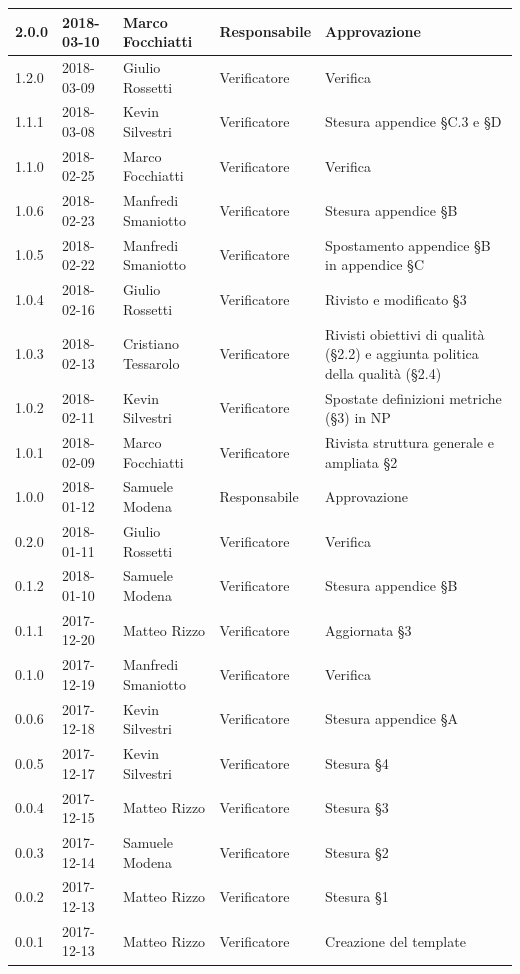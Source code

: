 \documentclass[openany,12pt,a4paper]{report}
\begin{document}
\begin{longtable}{|p{20mm}|p{20mm}|p{40mm}|p{30mm}|p{50mm}|}
		\hline
		
		2.0.0 & 2018-03-10 & Marco Focchiatti & Responsabile & Approvazione \\
		\hline 1.2.0 & 2018-03-09 & Giulio Rossetti & Verificatore & Verifica \\
		\hline 1.1.1 & 2018-03-08 & Kevin Silvestri & Verificatore & Stesura appendice §C.3 e §D  \\
		\hline 1.1.0 & 2018-02-25 & Marco Focchiatti & Verificatore & Verifica \\
		\hline 1.0.6 & 2018-02-23 & Manfredi Smaniotto & Verificatore & Stesura appendice §B \\
		\hline 1.0.5 & 2018-02-22 & Manfredi Smaniotto & Verificatore & Spostamento appendice §B in appendice §C \\
		\hline 1.0.4 & 2018-02-16 & Giulio Rossetti & Verificatore & Rivisto e modificato §3 \\
		\hline 1.0.3 & 2018-02-13 & Cristiano Tessarolo & Verificatore & Rivisti obiettivi di qualità (§2.2) e aggiunta politica della qualità (§2.4) \\
		\hline 1.0.2 & 2018-02-11 & Kevin Silvestri & Verificatore & Spostate definizioni metriche (§3) in NP\\
		\hline 1.0.1 & 2018-02-09 & Marco Focchiatti & Verificatore & Rivista struttura generale e ampliata §2 \\
		
		\hline
		 
		1.0.0 & 2018-01-12 & Samuele Modena & Responsabile & Approvazione \\
		\hline 0.2.0 & 2018-01-11 & Giulio Rossetti & Verificatore & Verifica \\
		\hline 0.1.2 & 2018-01-10 & Samuele Modena & Verificatore & Stesura appendice §B \\
		\hline 0.1.1 & 2017-12-20 & Matteo Rizzo & Verificatore & Aggiornata §3 \\
		\hline 0.1.0 & 2017-12-19 & Manfredi Smaniotto & Verificatore & Verifica \\		
		\hline 0.0.6 & 2017-12-18 & Kevin Silvestri & Verificatore & Stesura appendice §A \\
		\hline 0.0.5 & 2017-12-17 & Kevin Silvestri & Verificatore & Stesura §4 \\	
		\hline 0.0.4 & 2017-12-15 & Matteo Rizzo & Verificatore & Stesura §3 \\
		\hline 0.0.3 & 2017-12-14 & Samuele Modena & Verificatore & Stesura §2 \\
		\hline 0.0.2 & 2017-12-13 & Matteo Rizzo & Verificatore & Stesura §1 \\
		\hline 0.0.1 & 2017-12-13 & Matteo Rizzo & Verificatore & Creazione del template \\
		\hline
		
	\end{longtable}
\end{document}
